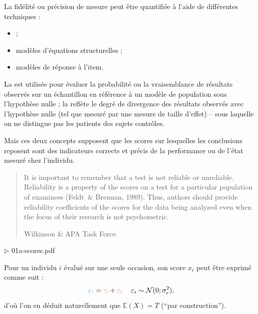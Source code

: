 
La fidélité ou précision de mesure peut être quantifiée à l'aide de différentes
techniques :
\begin{itemize}
\item {} ;
\item modèles d'équations structurelles ;
\item modèles de réponse à l'item.
\end{itemize}


La  est utilisée pour évaluer la
probabilité ou la vraisemblance de résultats observés sur un échantillon en
référence à un modèle de population sous l'hypothèse nulle ; la
 reflète le degré de divergence
des résultats observés avec l'hypothèse nulle (tel que mesuré par une mesure de
taille d'effet) -- sous laquelle on ne distingue pas les patients des sujets
contrôles\autocite{Thompson2003}.

Mais ces deux concepts supposent que les scores sur lesquelles les conclusions
reposent sont des indicateurs corrects et précis de la performance ou de l'état
mesuré chez l'individu.

\foilhead{}

\begin{quote}
It is important to remember that a test is not reliable or
unreliable. Reliability is a property of the scores on a test for a
particular population of examinees (Feldt~\& Brennan, 1989). Thus,
authors should provide reliability coefficients of the scores for the
data being analyzed even when the focus of their research is not
psychometric.

\raggedleft Wilkinson \& APA Task Force\autocite{Wilkinson1999}
\end{quote}


\hfill $\triangleright$ 01a-scores.pdf

Pour un individu $i$ évalué sur une seule occasion, son score $x_i$ peut être
exprimé comme suit : 
\[
\textcolor{CornflowerBlue}{x_i} = \textcolor{Apricot}{\tau_i} +
\textcolor{Thistle}{\varepsilon_i}\,\quad \varepsilon_i\sim\mathcal{N}(0;\sigma_e^2),
\]
d'où l'on en déduit naturellement que $\mathbb{E}(X)=T$ (\enquote{par construction}).

